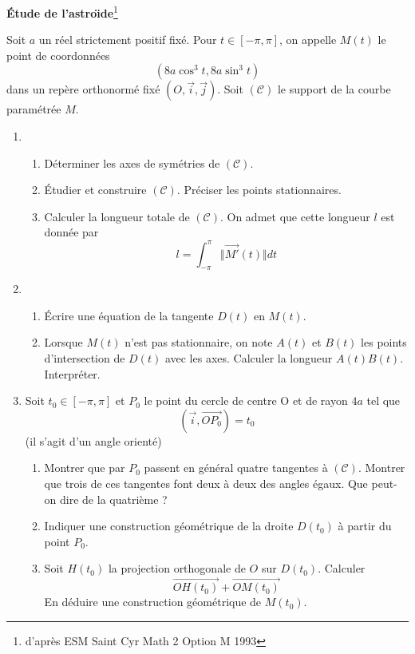 \textbf{{\'E}tude de l'astro{\"\i}de}\footnote{d'apr{\`e}s ESM Saint Cyr Math 2
Option M 1993}

 Soit $a$ un réel strictement positif fixé. Pour $t\in [-\pi,\pi]$, on appelle $M(t)$ le point de coordonn{\'e}es
\[(8a\cos^3t,8a\sin^3t)\]
dans un rep{\`e}re orthonorm{\'e} fix{\'e} $(O,\overrightarrow{i},\overrightarrow{j})$.\newline
Soit $(\mathcal{C})$ le support de la courbe param{\'e}tr{\'e}e $M$.
\begin{enumerate}
  \item
    \begin{enumerate}
     \item D{\'e}terminer les axes de sym{\'e}tries de $(\mathcal{C})$.
     \item {\'E}tudier et construire $(\mathcal{C})$. Pr{\'e}ciser les
     points stationnaires.
     \item Calculer la longueur totale de $(\mathcal{C})$. On admet que cette longueur $l$ est donn{\'e}e par
\[l=\int_{-\pi}^{\pi}\Vert\overrightarrow{M'}(t)\Vert dt\]
    \end{enumerate}
  \item
   \begin{enumerate}
     \item {\'E}crire une {\'e}quation de la tangente $D(t)$ en $M(t)$.
     \item Lorsque $M(t)$ n'est pas stationnaire, on note $A(t)$ et $B(t)$ les points d'intersection de
     $D(t)$ avec les axes. Calculer la longueur $A(t)B(t)$. Interpr{\'e}ter.
   \end{enumerate}

  \item Soit $t_0 \in [-\pi,\pi]$ et $P_0$ le point du cercle de centre O et de rayon
  $4a$ tel que 
\begin{displaymath}
(\overrightarrow{i},\overrightarrow{OP_0}) = t_0 
\end{displaymath}
(il s'agit d'un angle orienté)
   \begin{enumerate}
     \item Montrer que par $P_0$ passent en g{\'e}n{\'e}ral quatre tangentes {\`a} $(\mathcal{C})$.\newline
Montrer que trois de ces tangentes font deux {\`a} deux des angles {\'e}gaux. Que peut-on dire de la quatri{\`e}me ?
     \item Indiquer une construction g{\'e}om{\'e}trique de la droite $D(t_0)$ {\`a} partir du point $P_0$.
     \item Soit $H(t_0)$ la projection orthogonale de $O$ sur $D(t_0)$.\newline
Calculer
\begin{displaymath}
\overrightarrow{OH(t_0)}+\overrightarrow{OM(t_0)} 
\end{displaymath}
En d{\'e}duire une construction g{\'e}om{\'e}trique de $M(t_0)$.
   \end{enumerate}

\end{enumerate}
